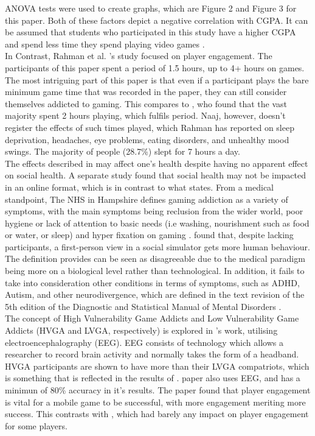 \documentclass[conference]{IEEEtran}
\begin{document}
ANOVA tests were used to create graphs, which are Figure 2 and Figure 3 for this paper. Both of these factors depict a negative correlation with CGPA. It can be assumed that students who participated in this study have a higher CGPA and spend less time they spend playing video games \cite{Naaj2021}.\\

In Contrast, Rahman et al. 's \cite{Rahman2021} study focused on player engagement. The participants of this paper spent a period of 1.5 hours, up to 4+ hours on games. The most intriguing part of this paper is that even if a participant plays the bare minimum game time that was recorded in the paper, they can still consider themselves addicted to gaming. This compares to \cite{Naaj2021}, who found that the vast majority spent 2 hours playing, which fulfils \cite{Rahman2021} period. Naaj, however, doesn't register the effects of such times played, which Rahman has reported on sleep deprivation, headaches, eye problems, eating disorders, and unhealthy mood swings. The majority of people (28.7\%) slept for 7 hours a day.\\

The effects described in \cite{Rahman2021} may affect one's health despite having no apparent effect on social health. A separate study \cite{Schlagowski2024} found that social health may not be impacted in an online format, which is in contrast to what \cite{NHSHamp24} states. From a medical standpoint, The NHS in Hampshire defines gaming addiction as a variety of symptoms, with the main symptoms being reclusion from the wider world, poor hygiene or lack of attention to basic needs (i.e washing, nourishment such as food or water, or sleep) and hyper fixation on gaming \cite{NHSHamp24}. \cite{Schlagowski2024} found that, despite lacking participants, a first-person view in a social simulator gets more human behaviour. The definition \cite{NHSHamp24} provides can be seen as disagreeable due to the medical paradigm being more on a biological level rather than technological. In addition, it fails to take into consideration other conditions in terms of symptoms, such as ADHD, Autism, and other neurodivergence, which are defined in the text revision of the 5th edition of the Diagnostic and Statistical Manual of Mental Disorders \cite{Association2022}.\\

The concept of High Vulnerability Game Addicts and Low Vulnerability Game Addicts (HVGA and LVGA, respectively) is explored in \cite{Jing2024}'s work, utilising electroencephalography (EEG). EEG consists of technology which allows a researcher to record brain activity and normally takes the form of a headband. HVGA participants are shown to have more than their LVGA compatriots, which is something that is reflected in the results of \cite{Naaj2021}. \cite{Ruqeyya2022} paper also uses EEG, and has a minimun of 80\%  accuracy in it's results. The paper found that player engagement is vital for a mobile game to be successful, with more engagement meriting more success. This contrasts with \cite{Schlagowski2024}, which had barely any impact on player engagement for some players.
\end{document}
